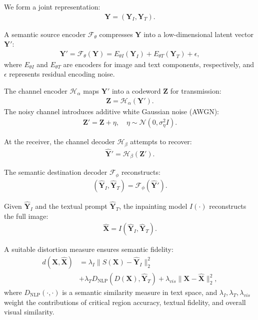 \documentclass[conference]{IEEEtran}
\begin{document}
We form a joint representation:
\begin{align}
\bm{Y} = (\bm{Y}_I,\bm{Y}_T).
\end{align}

A semantic source encoder $\mathcal{F}_{\theta}$ compresses $\bm{Y}$ into a low-dimensional latent vector $\bm{Y'}$:
\begin{align}
\bm{Y'} = \mathcal{F}_{\theta}(\bm{Y}) = E_{\theta I}(\bm{Y}_I) + E_{\theta T}(\bm{Y}_T) + \epsilon,
\end{align}
where $E_{\theta I}$ and $E_{\theta T}$ are encoders for image and text components, respectively, and $\epsilon$ represents residual encoding noise.

The channel encoder $\mathcal{H}_{\alpha}$ maps $\bm{Y'}$ into a codeword $\bm{Z}$ for transmission:
\begin{align}
\bm{Z} = \mathcal{H}_{\alpha}(\bm{Y'}).
\end{align}
The noisy channel introduces additive white Gaussian noise (AWGN):
\begin{align}
\bm{Z'} = \bm{Z} + \eta, \quad \eta\sim \mathcal{N}(0,\sigma_{\eta}^2 I).
\end{align}

At the receiver, the channel decoder $\mathcal{H}_{\beta}$ attempts to recover:
\begin{align}
\bm{\hat{Y}'} = \mathcal{H}_{\beta}(\bm{Z'}).
\end{align}

The semantic destination decoder $\mathcal{F}_{\phi}$ reconstructs:
\begin{align}
(\hat{\bm{Y}}_I,\hat{\bm{Y}}_T) = \mathcal{F}_{\phi}(\bm{\hat{Y}'}).
\end{align}

Given $\hat{\bm{Y}}_I$ and the textual prompt $\hat{\bm{Y}}_T$, the inpainting model $I(\cdot)$ reconstructs the full image:
\begin{align}
\hat{\bm{X}} = I(\hat{\bm{Y}}_I,\hat{\bm{Y}}_T).
\end{align}

A suitable distortion measure ensures semantic fidelity:
\begin{align}
d(\bm{X},\hat{\bm{X}}) &= \lambda_I \|S(\bm{X}) - \hat{\bm{Y}}_I\|_2^2 \nonumber \\ 
 &+\lambda_T D_{\text{NLP}}(D(\bm{X}),\hat{\bm{Y}}_T) + \lambda_{vis}\|\bm{X}-\hat{\bm{X}}\|_2^2,
\end{align}
where $D_{\text{NLP}}(\cdot,\cdot)$ is a semantic similarity measure in text space, and $\lambda_I,\lambda_T,\lambda_{vis}$ weight the contributions of critical region accuracy, textual fidelity, and overall visual similarity.
\end{document}
